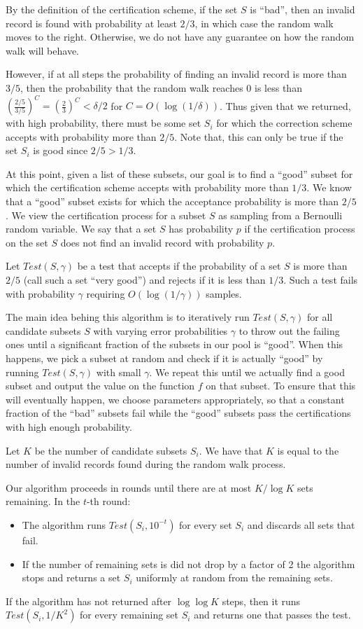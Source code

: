 By the definition of the certification scheme, if the set $S$ is ``bad'', then an invalid record is found with probability at least $2/3$, in which case the random walk moves to the right. Otherwise, we do not have any guarantee on how the random walk will behave.

However, if at all steps the probability of finding an invalid record is more than $3/5$, then the probability that the random walk reaches 0 is less than $(\frac {2/5} {3/5})^C = (\frac 2 3)^C < \delta/2$ for $C=O(\log(1/\delta))$. Thus given that we returned, with high probability, there must be some set $S_i$ for which the correction scheme accepts with probability more than $2/5$. Note that, this can only be true if the set $S_i$ is good since $2/5 > 1/3$.

At this point, given a list of these subsets, our goal is to find a ``good'' subset for which the certification scheme accepts with probability more than $1/3$. We know that a ``good'' subset exists for which the acceptance probability is more than $2/5$. We view the certification process for a subset $S$ as sampling from a Bernoulli random variable. We say that a set $S$ has probability $p$ if the certification process on the set $S$ does not find an invalid record with probability $p$.

Let $Test(S,\gamma)$ be a test that accepts if the probability of a set $S$ is more than $2/5$ (call such a set ``very good'') and rejects if it is less than $1/3$. Such a test fails with probability $\gamma$ requiring $O(\log(1/\gamma))$ samples.

The main idea behing this algorithm is to iteratively run $Test(S,\gamma)$ for all candidate subsets $S$ with varying error probabilities $\gamma$ to throw out the failing ones until a significant fraction of the subsets in our pool is ``good''.  When this happens, we pick a subset at random and check if it is actually ``good'' by running $Test(S,\gamma)$ with small $\gamma$. We repeat this until we actually find a good subset and output the value on the function $f$ on that subset. To ensure that this will eventually happen, we choose parameters appropriately, so that a constant fraction of the ``bad'' subsets fail while the ``good'' subsets pass the certifications with high enough probability.


Let $K$ be the number of candidate subsets $S_i$. We have that $K$ is equal to the number of invalid records found during the random walk process.

Our algorithm proceeds in rounds until there are at most $K / \log K$ sets remaining. In the $t$-th round:
\begin{itemize}
  \item The algorithm runs $Test(S_i,10^{-t})$ for every set $S_i$ and discards all sets that fail.
  \item If the number of remaining sets is did not drop by a factor of 2 the algorithm stops and returns a set $S_i$ uniformly at random from the remaining sets.
\end{itemize}
If the algorithm has not returned after $\log \log K$ steps, then it runs $Test(S_i,1/K^2)$ for every remaining set $S_i$ and returns one that passes the test.

